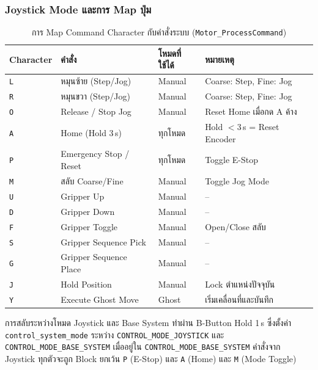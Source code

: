 \subsubsection{Joystick Mode และการ Map ปุ่ม}
\label{subsubsec:joystick_mode_mapping}

\begin{table}[H]
  \centering
  \caption{การ Map Command Character กับคำสั่งระบบ
           (\texttt{Motor\_ProcessCommand})}
  \label{tab:joystick_map_fw}
  \begin{tabular}{llll}
    \toprule
    Character & คำสั่ง & โหมดที่ใช้ได้ & หมายเหตุ \\
    \midrule
    \texttt{L} & หมุนซ้าย (Step/Jog)    & Manual & Coarse: Step, Fine: Jog \\
    \texttt{R} & หมุนขวา (Step/Jog)     & Manual & Coarse: Step, Fine: Jog \\
    \texttt{O} & Release / Stop Jog      & Manual & Reset Home เมื่อกด A ค้าง \\
    \texttt{A} & Home (Hold 3\,s)        & ทุกโหมด & Hold $<$3\,s = Reset Encoder \\
    \texttt{P} & Emergency Stop / Reset  & ทุกโหมด & Toggle E-Stop \\
    \texttt{M} & สลับ Coarse/Fine        & Manual & Toggle Jog Mode \\
    \texttt{U} & Gripper Up              & Manual & -- \\
    \texttt{D} & Gripper Down            & Manual & -- \\
    \texttt{F} & Gripper Toggle          & Manual & Open/Close สลับ \\
    \texttt{S} & Gripper Sequence Pick   & Manual & -- \\
    \texttt{G} & Gripper Sequence Place  & Manual & -- \\
    \texttt{J} & Hold Position           & Manual & Lock ตำแหน่งปัจจุบัน \\
    \texttt{Y} & Execute Ghost Move      & Ghost  & เริ่มเคลื่อนที่และบันทึก \\
    \bottomrule
  \end{tabular}
\end{table}

การสลับระหว่างโหมด Joystick และ Base System
ทำผ่าน B-Button Hold 1\,s ซึ่งตั้งค่า
\texttt{control\_system\_mode} ระหว่าง
\texttt{CONTROL\_MODE\_JOYSTICK} และ
\texttt{CONTROL\_MODE\_BASE\_SYSTEM}
เมื่ออยู่ใน \texttt{CONTROL\_MODE\_BASE\_SYSTEM}
คำสั่งจาก Joystick ทุกตัวจะถูก Block ยกเว้น
\texttt{P} (E-Stop) และ \texttt{A} (Home)
และ \texttt{M} (Mode Toggle)